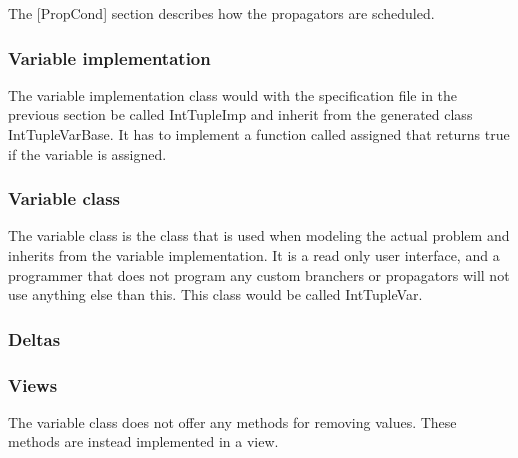 \documentclass[a4paper,11pt]{article}
\begin{document}
The [PropCond] section describes how the propagators are scheduled.

\subsubsection{Variable implementation}
The variable implementation class would with the specification file in the previous section be called IntTupleImp and inherit from the generated class IntTupleVarBase. It has to implement a function called assigned that returns true if the variable is assigned.
\subsubsection{Variable class}
The variable class is the class that is used when modeling the actual problem and inherits from the variable implementation. It is a read only user interface, and a programmer that does not program any custom branchers or propagators will not use anything else than this. This class would be called IntTupleVar.

\subsubsection{Deltas}
\subsubsection{Views}
The variable class does not offer any methods for removing values. These methods are instead implemented in a view.
\end{document}

